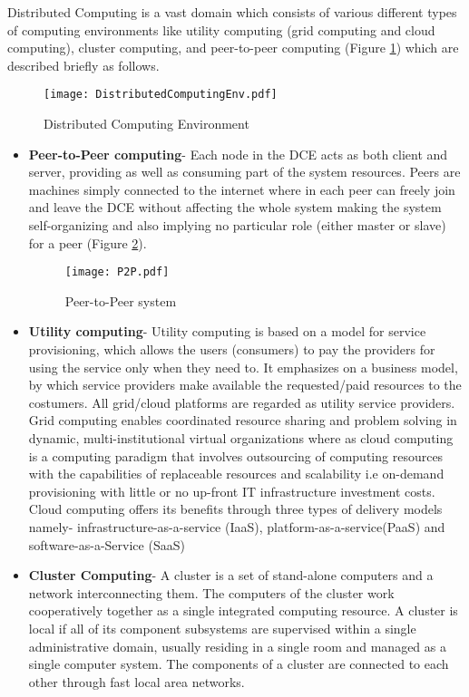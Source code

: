 Distributed Computing is a vast domain which consists of various different types of computing environments like utility computing (grid computing and cloud computing), cluster computing, and peer-to-peer computing (Figure \ref{fig:DCEnv}) which are described briefly as follows.

\begin{figure}[ht!]
\centering
\texttt{[image: DistributedComputingEnv.pdf]}
\caption{Distributed Computing Environment}
\label{fig:DCEnv}
\end{figure}

\begin{itemize}
\item \textbf{Peer-to-Peer computing}- Each node in the DCE acts as both client and server, providing as well as consuming part of the system resources. Peers are machines simply connected to the internet where in each peer can freely join and leave the DCE without affecting the whole system making the system self-organizing  and also implying no particular role (either master or slave) for a peer (Figure \ref{fig:PP}).

\begin{figure}[ht!]
\centering
\texttt{[image: P2P.pdf]}
\caption{Peer-to-Peer system}
\label{fig:PP}
\end{figure}

\item \textbf{Utility computing}- Utility computing is based on a model for service provisioning, which allows the users (consumers) to pay the providers for using the service only when they need to. It emphasizes on a business model, by which service providers make available the requested/paid resources to the costumers. All grid/cloud platforms are regarded as utility service providers. Grid computing enables coordinated resource sharing and problem solving in dynamic, multi-institutional virtual organizations where as cloud computing is a computing paradigm that involves outsourcing of computing resources with the capabilities of  replaceable resources and scalability i.e on-demand provisioning with little or no up-front IT infrastructure investment costs. Cloud computing offers its benefits through three types of delivery models namely- infrastructure-as-a-service (IaaS), platform-as-a-service(PaaS) and software-as-a-Service (SaaS) 

\item \textbf{Cluster Computing}- A cluster is a set of stand-alone computers and a network interconnecting them. The computers of the cluster work cooperatively together as a single integrated computing resource. A cluster is local if all of its component subsystems are supervised within a single administrative domain, usually residing in a single room and managed as a single computer system. The components of a cluster are connected to each other through fast local area networks. 

\end{itemize}
